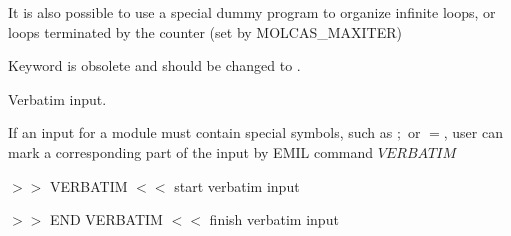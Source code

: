 It is also possible to use a special dummy program  to organize
infinite loops, or loops terminated by the counter (set by MOLCAS\_MAXITER)

Keyword  is obsolete and should be changed to .


Verbatim input.

If an input for a module must contain special symbols, such as $;$ or $=$, user can
mark a corresponding part of the input by EMIL command $VERBATIM$
\begin{commandlist}
\item[$>>$ VERBATIM $<<$] start verbatim input
\item[$>>$ END VERBATIM $<<$] finish verbatim input
\end{commandlist}


